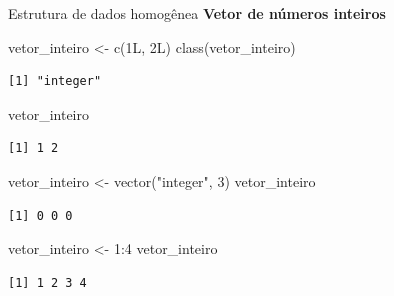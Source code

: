 \documentclass[
  10pt,
  ignorenonframetext,
]{beamer}
\newenvironment{Shaded}{\begin{snugshade}}{\end{snugshade}}
\newcommand{\DecValTok}[1]{\textcolor[rgb]{0.68,0.00,0.00}{#1}}
\newcommand{\FunctionTok}[1]{\textcolor[rgb]{0.28,0.35,0.67}{#1}}
\newcommand{\NormalTok}[1]{\textcolor[rgb]{0.00,0.23,0.31}{#1}}
\newcommand{\OtherTok}[1]{\textcolor[rgb]{0.00,0.23,0.31}{#1}}
\newcommand{\SpecialCharTok}[1]{\textcolor[rgb]{0.37,0.37,0.37}{#1}}
\newcommand{\StringTok}[1]{\textcolor[rgb]{0.13,0.47,0.30}{#1}}
\begin{document}
\begin{frame}[fragile]{Estrutura de dados homogênea}
\protect\hypertarget{estrutura-de-dados-homoguxeanea-2}{}
\textbf{Vetor de números inteiros}

\begin{Shaded}
\begin{Highlighting}[]
\NormalTok{vetor\_inteiro  }\OtherTok{\textless{}{-}} \FunctionTok{c}\NormalTok{(1L, 2L)}
\FunctionTok{class}\NormalTok{(vetor\_inteiro)}
\end{Highlighting}
\end{Shaded}

\begin{verbatim}
[1] "integer"
\end{verbatim}

\begin{Shaded}
\begin{Highlighting}[]
\NormalTok{vetor\_inteiro}
\end{Highlighting}
\end{Shaded}

\begin{verbatim}
[1] 1 2
\end{verbatim}

\begin{Shaded}
\begin{Highlighting}[]
\NormalTok{vetor\_inteiro }\OtherTok{\textless{}{-}} \FunctionTok{vector}\NormalTok{(}\StringTok{"integer"}\NormalTok{, }\DecValTok{3}\NormalTok{)}
\NormalTok{vetor\_inteiro}
\end{Highlighting}
\end{Shaded}

\begin{verbatim}
[1] 0 0 0
\end{verbatim}

\begin{Shaded}
\begin{Highlighting}[]
\NormalTok{vetor\_inteiro }\OtherTok{\textless{}{-}} \DecValTok{1}\SpecialCharTok{:}\DecValTok{4}
\NormalTok{vetor\_inteiro}
\end{Highlighting}
\end{Shaded}

\begin{verbatim}
[1] 1 2 3 4
\end{verbatim}
\end{frame}
\end{document}
